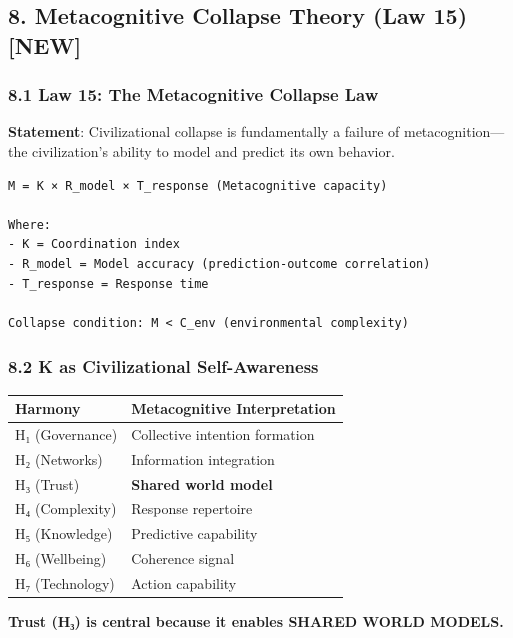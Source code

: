 \documentclass[11pt,letterpaper]{article}
\begin{document}
\subsection{8. Metacognitive Collapse Theory (Law 15)
{[}NEW{]}}\label{metacognitive-collapse-theory-law-15-new}

\subsubsection{8.1 Law 15: The Metacognitive Collapse
Law}\label{law-15-the-metacognitive-collapse-law}

\textbf{Statement}: Civilizational collapse is fundamentally a failure
of metacognition---the civilization's ability to model and predict its
own behavior.

\begin{verbatim}
M = K × R_model × T_response (Metacognitive capacity)

Where:
- K = Coordination index
- R_model = Model accuracy (prediction-outcome correlation)
- T_response = Response time

Collapse condition: M < C_env (environmental complexity)
\end{verbatim}

\subsubsection{8.2 K as Civilizational
Self-Awareness}\label{k-as-civilizational-self-awareness}

\begin{longtable}[]{@{}ll@{}}
\toprule\noalign{}
Harmony & Metacognitive Interpretation \\
\midrule\noalign{}
\endhead
\bottomrule\noalign{}
\endlastfoot
H₁ (Governance) & Collective intention formation \\
H₂ (Networks) & Information integration \\
H₃ (Trust) & \textbf{Shared world model} \\
H₄ (Complexity) & Response repertoire \\
H₅ (Knowledge) & Predictive capability \\
H₆ (Wellbeing) & Coherence signal \\
H₇ (Technology) & Action capability \\
\end{longtable}

\textbf{Trust (H₃) is central because it enables SHARED WORLD MODELS.}
\end{document}
